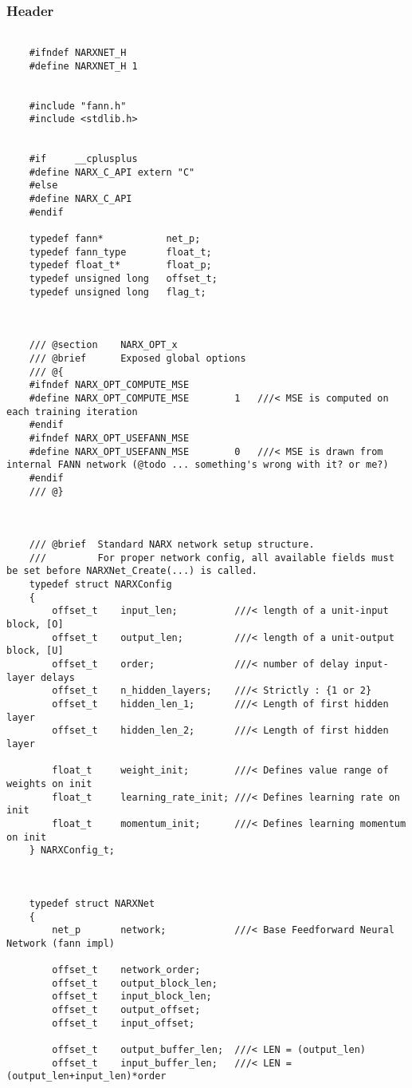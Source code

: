 \subsubsection{Header}
\begin{lstlisting}

	#ifndef NARXNET_H
	#define NARXNET_H 1


	#include "fann.h"
	#include <stdlib.h>


	#if		__cplusplus
	#define NARX_C_API extern "C"
	#else
	#define NARX_C_API
	#endif

	typedef fann*			net_p;
	typedef fann_type		float_t;
	typedef float_t*		float_p;
	typedef unsigned long	offset_t;
	typedef unsigned long 	flag_t;



	/// @section	NARX_OPT_x
	/// @brief		Exposed global options
	/// @{
	#ifndef NARX_OPT_COMPUTE_MSE
	#define NARX_OPT_COMPUTE_MSE		1	///< MSE is computed on each training iteration
	#endif
	#ifndef NARX_OPT_USEFANN_MSE
	#define NARX_OPT_USEFANN_MSE		0	///< MSE is drawn from internal FANN network (@todo ... something's wrong with it? or me?)
	#endif
	/// @}



	/// @brief	Standard NARX network setup structure.
	///			For proper network config, all available fields must be set before NARXNet_Create(...) is called.
	typedef struct NARXConfig
	{
		offset_t	input_len;			///< length of a unit-input block, [O]
		offset_t	output_len;			///< length of a unit-output block, [U]
		offset_t	order;				///< number of delay input-layer delays
		offset_t	n_hidden_layers;	///< Strictly : {1 or 2}
		offset_t	hidden_len_1;		///< Length of first hidden layer
		offset_t	hidden_len_2;		///< Length of first hidden layer

		float_t		weight_init;		///< Defines value range of weights on init
		float_t		learning_rate_init;	///< Defines learning rate on init
		float_t		momentum_init;		///< Defines learning momentum on init
	} NARXConfig_t;



	typedef struct NARXNet
	{
		net_p		network;			///< Base Feedforward Neural Network (fann impl)

		offset_t	network_order;
		offset_t	output_block_len;
		offset_t	input_block_len;
		offset_t	output_offset;
		offset_t	input_offset;

		offset_t	output_buffer_len;	///< LEN = (output_len)					
		offset_t	input_buffer_len;	///< LEN = (output_len+input_len)*order


\end{lstlisting}

